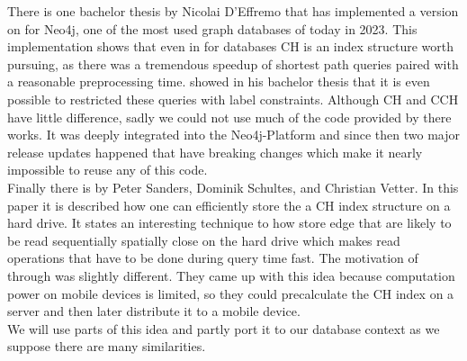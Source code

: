 There is one bachelor thesis by Nicolai D'Effremo \cite[Some text]{DEffremo2019} that has implemented a version on \cite[Contraction Hierarchies]{Geisberger_2012} for Neo4j, one 
of the most used graph databases of today in 2023. This implementation shows that even in for databases CH is an index structure worth pursuing, as there was a tremendous speedup 
of shortest path queries paired with a reasonable preprocessing time. \cite{Zickenberg2021} showed in his bachelor thesis that it is even possible to restricted these
queries with label constraints. Although CH and CCH have little difference, sadly we could not use much of the code provided by there works. It
was deeply integrated into the Neo4j-Platform and since then two major release updates happened that have breaking changes which make it nearly impossible to reuse any of
this code.\\

Finally there is \cite[Mobile Route Planning]{Sanders} by Peter Sanders, Dominik Schultes, and Christian Vetter. In this paper it is described how one can efficiently store
the a CH index structure on a hard drive. It states an interesting technique to how store edge that are likely to be read sequentially spatially close on the hard drive which 
makes read operations that have to be done during query time fast. The motivation of \cite[Mobile Route Planning]{Sanders} through was slightly different. They came up with this
idea because computation power on mobile devices is limited, so they could precalculate the CH index on a server and then later distribute it to a mobile device.
\\
We will use parts of this idea and partly port it to our database context as we suppose there are many similarities.
